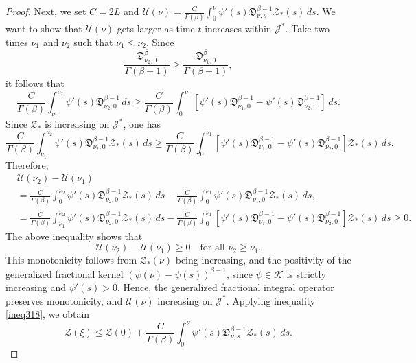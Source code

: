 \documentclass[10pt,a4paper]{amsart}
\numberwithin{equation}{section}
\begin{document}
\begin{proof}
Next, we set $C=2 L$ and $\mathcal{U}(\nu )=\frac{C}{\Gamma(\beta)}
 \int_0^{\nu } \psi'(s)\mathfrak{D}_{\nu ,s}^{\beta-1} \mathcal{Z}_{*}(s)\,ds$.
We want to show that \( \mathcal{U}(\nu ) \) gets larger as time \( t \) 
increases within \( \mathcal{J}^{*} \). 
Take two times \( \nu _1 \) and \( \nu _2 \) such that 
\( \nu _1 \leq \nu _2 \). Since
$$
\frac{\mathfrak{D}_{\nu _2,0}^{\beta}}{\Gamma(\beta+1)} 
\geq \frac{\mathfrak{D}_{\nu _1,0}^{\beta}}{\Gamma(\beta+1)},
$$
it follows that
$$
\frac{C}{\Gamma(\beta)} \int_{\nu _{1}}^{\nu _{2}} \psi'(s)
\mathfrak{D}_{\nu _{2},0}^{\beta-1}\,ds 
\geq \frac{C}{\Gamma(\beta)} \int_0^{\nu _{1}}[\psi'(s)\mathfrak{D}_{\nu _{1},0}^{\beta-1} -\psi'(s)\mathfrak{D}_{\nu _{2},0}^{\beta-1} ]\,ds.
$$
Since $\mathcal{Z}_{*}$ is increasing on $\mathcal{J}^{*}$, one has
$$
\frac{C}{\Gamma(\beta)} \int_{\nu _{1}}^{\nu _{2}} 
\psi'(s)\mathfrak{D}_{\nu _{2},0}^{\beta-1} \mathcal{Z}_{*}(s)\,ds 
\geq \frac{C}{\Gamma(\beta)} \int_0^{\nu _{1}}[\psi'(s)
\mathfrak{D}_{\nu _{1},0}^{\beta-1} -\psi'(s)\mathfrak{D}_{\nu _{2},0}^{\beta-1} ]
 \mathcal{Z}_{*}(s)\,ds.
$$
Therefore, 
\begin{align*}
&\mathcal{U}(\nu _{2})-\mathcal{U}(\nu _{1}) \\
& =\frac{C}{\Gamma(\beta)} \int_0^{\nu _{2}} \psi'(s)
 \mathfrak{D}_{\nu _{2},0}^{\beta-1} \mathcal{Z}_{*}(s)\,ds
  -\frac{C}{\Gamma(\beta)} \int_0^{\nu _{1}} \psi'(s)\mathfrak{D}_{\nu _{1},0}^{\beta-1}
   \mathcal{Z}_{*}(s)\,ds, \\
& =\frac{C}{\Gamma(\beta)} \int_{\nu _{1}}^{\nu _{2}} \psi'(s)
 \mathfrak{D}_{\nu _{2},0}^{\beta-1} \mathcal{Z}_{*}(s)\,ds
 -\frac{C}{\Gamma(\beta)} \int_0^{\nu _{1}}[\psi'(s)\mathfrak{D}_{\nu _{1},0}^{\beta-1}
  -\psi'(s)\mathfrak{D}_{\nu _{2},0}^{\beta-1} ] 
 \mathcal{Z}_{*}(s)\,ds \geq 0.
\end{align*}
The above inequality shows that
\[
\mathcal{U}(\nu_2)-\mathcal{U}(\nu_1)\ge 0
\quad \text{for all } \nu_2\ge\nu_1.
\]
This monotonicity follows from  \(\mathcal{Z}_{*}(\nu)\) being increasing,
and the positivity of the generalized fractional kernel
$(\psi(\nu)-\psi(s))^{\beta-1}$, since $\psi\in\mathcal{K}$ is strictly
increasing and $\psi'(s)>0$.
Hence, the generalized fractional integral operator preserves
monotonicity, and $\mathcal{U}(\nu)$ increasing on $\mathcal{J}^*$.
Applying inequality \eqref{ineq318}, we obtain
\begin{equation}\label{ineq320}
\mathcal{Z}(\xi) \leq \mathcal{Z}(0)+\frac{C}{\Gamma(\beta)} 
\int_0^{\nu } \psi'(s)\mathfrak{D}_{\nu ,s}^{\beta-1} \mathcal{Z}_{*}(s)\,ds.

\end{equation}
\end{proof}
\end{document}
